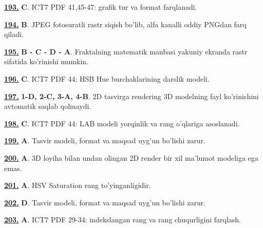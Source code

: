 \documentclass[10pt,a4paper,oneside]{article}
\begin{document}
\noindent\hyperlink{q193}{\textbf{193.}} \textbf{C}.  ICT7 PDF 41,45-47: grafik tur va format farqlanadi.
\par\vspace{3mm}
\noindent\hyperlink{q194}{\textbf{194.}} \textbf{B}.  JPEG fotosuratli rastr siqish bo'lib, alfa kanalli oddiy PNGdan farq qiladi.
\par\vspace{3mm}
\noindent\hyperlink{q195}{\textbf{195.}} \textbf{B - C - D - A}.  Fraktalning matematik manbasi yakuniy ekranda rastr sifatida ko'rinishi mumkin.
\par\vspace{3mm}
\noindent\hyperlink{q196}{\textbf{196.}} \textbf{C}.  ICT7 PDF 44: HSB Hue burchaklarining darslik modeli.
\par\vspace{3mm}
\noindent\hyperlink{q197}{\textbf{197.}} \textbf{1-D, 2-C, 3-A, 4-B}.  2D tasvirga rendering 3D modelning fayl ko'rinishini avtomatik saqlab qolmaydi.
\par\vspace{3mm}
\noindent\hyperlink{q198}{\textbf{198.}} \textbf{C}.  ICT7 PDF 44: LAB modeli yorqinlik va rang o'qlariga asoslanadi.
\par\vspace{3mm}
\noindent\hyperlink{q199}{\textbf{199.}} \textbf{A}.  Tasvir modeli, format va maqsad uyg'un bo'lishi zarur.
\par\vspace{3mm}
\noindent\hyperlink{q200}{\textbf{200.}} \textbf{A}.  3D loyiha bilan undan olingan 2D render bir xil ma'lumot modeliga ega emas.
\par\vspace{3mm}
\noindent\hyperlink{q201}{\textbf{201.}} \textbf{A}.  HSV Saturation rang to'yinganligidir.
\par\vspace{3mm}
\noindent\hyperlink{q202}{\textbf{202.}} \textbf{D}.  Tasvir modeli, format va maqsad uyg'un bo'lishi zarur.
\par\vspace{3mm}
\noindent\hyperlink{q203}{\textbf{203.}} \textbf{A}.  ICT7 PDF 29-34: indekslangan rang va rang chuqurligini farqlash.
\par\vspace{3mm}
\end{document}
